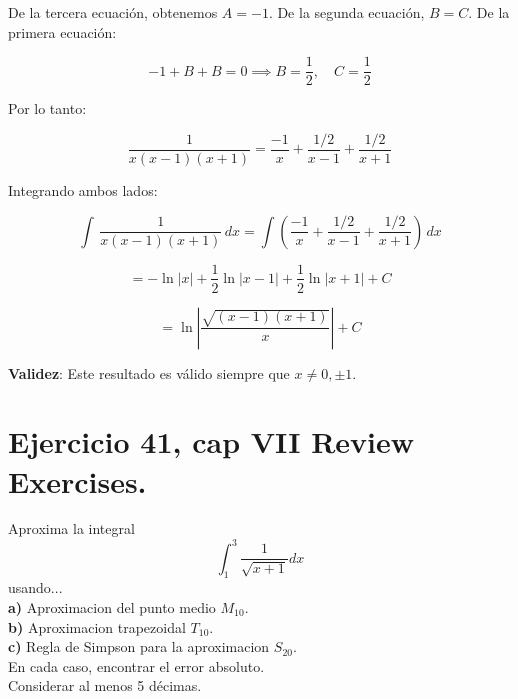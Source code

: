 \documentclass[11pt,letterpaper]{article}
\begin{document}
De la tercera ecuaci\'on, obtenemos $A = -1$. De la segunda ecuaci\'on, $B = C$. De la primera ecuaci\'on:

\begin{equation*}
    -1 + B + B = 0 \implies B = \frac{1}{2}, \quad C = \frac{1}{2}
\end{equation*}

Por lo tanto:

\begin{equation*}
    \frac{1}{x(x-1)(x+1)} = \frac{-1}{x} + \frac{1/2}{x-1} + \frac{1/2}{x+1}
\end{equation*}

Integrando ambos lados:

\begin{equation*}
    \int \, \frac{1}{x(x-1)(x+1)} \, dx = \int \left( \frac{-1}{x} + \frac{1/2}{x-1} + \frac{1/2}{x+1} \right) \, dx
\end{equation*}

\begin{equation*}
    = -\ln |x| + \frac{1}{2} \ln |x-1| + \frac{1}{2} \ln |x+1| + C
\end{equation*}

\begin{equation*}
    = \ln \left| \frac{\sqrt{(x-1)(x+1)}}{x} \right| + C
\end{equation*}

\textbf{Validez}: Este resultado es v\'alido siempre que $x \neq 0, \pm 1$.


\section{Ejercicio 41, cap VII Review Exercises.}
Aproxima la integral
\begin{equation*}
  \int_1^3 \frac{1}{\sqrt{x+1}}dx
\end{equation*}
usando...\\
\textbf{a)} Aproximacion del punto medio $M_{10}$.\\
\textbf{b)} Aproximacion trapezoidal $T_{10}$.\\
\textbf{c)} Regla de Simpson para la aproximacion $S_{20}$.\\
En cada caso, encontrar el error absoluto.\\
Considerar al menos 5 décimas.
\end{document}
